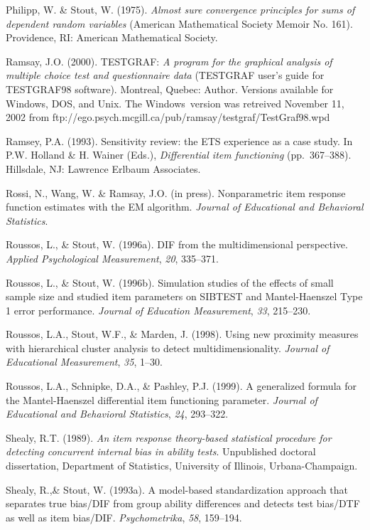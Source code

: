 \documentclass[titlepage,11pt,twoside]{article}
\begin{document}
\begin{thebibliography}
\bibitem Philipp, W. \& Stout, W. (1975). \textit{Almost sure convergence principles for sums of dependent random variables} (American Mathematical Society Memoir No. 161). Providence, RI: American Mathematical Society.

\bibitem Ramsay, J.O. (2000). TESTGRAF: \textit{A program for the graphical analysis of multiple choice test and questionnaire data} (TESTGRAF user's guide for TESTGRAF98 software). Montreal, Quebec: Author. Versions available for Windows\textregistered, DOS, and Unix. The Windows\textregistered\ version was retreived November 11, 2002 from \mbox{ftp://ego.psych.mcgill.ca/pub/ramsay/testgraf/TestGraf98.wpd}

\bibitem Ramsey, P.A. (1993). Sensitivity review: the ETS experience as a case study. In P.W. Holland \& H. Wainer (Eds.), \textit{Differential item functioning} (pp.~367--388). Hillsdale, NJ: Lawrence Erlbaum Associates.

\bibitem Rossi, N., Wang, W. \& Ramsay, J.O. (in press). Nonparametric item response function estimates with the EM algorithm. \textit{Journal of Educational and Behavioral Statistics}.

\bibitem Roussos, L., \& Stout, W. (1996a). DIF from the multidimensional perspective. \textit{Applied Psychological Measurement}, \textit{20}, 335--371.

\bibitem Roussos, L., \& Stout, W. (1996b). Simulation studies of the effects of small sample size and studied item parameters on SIBTEST and Mantel-Haenszel Type 1 error performance. \textit{Journal of Education Measurement}, \textit{33}, 215--230.

\bibitem Roussos, L.A., Stout, W.F., \& Marden, J. (1998). Using new proximity measures with hierarchical cluster analysis to detect multidimensionality. \textit{Journal of Educational Measurement}, \textit{35}, 1--30.

\bibitem Roussos, L.A., Schnipke, D.A., \& Pashley, P.J. (1999). A generalized formula for the Mantel-Haenszel differential item functioning parameter. \textit{Journal of Educational and Behavioral Statistics}, \textit{24}, 293--322.

\bibitem Shealy, R.T. (1989). \textit{An item response theory-based statistical procedure for detecting concurrent internal bias in ability tests}. Unpublished doctoral dissertation, Department of Statistics, University of Illinois, Urbana-Champaign.

Shealy, R.,\& Stout, W. (1993a). A model-based standardization approach that separates true bias/DIF from group ability differences and detects test bias/DTF as well as item bias/DIF. \textit{Psychometrika}, \textit{58}, 159--194.


\end{thebibliography}
\end{document}
